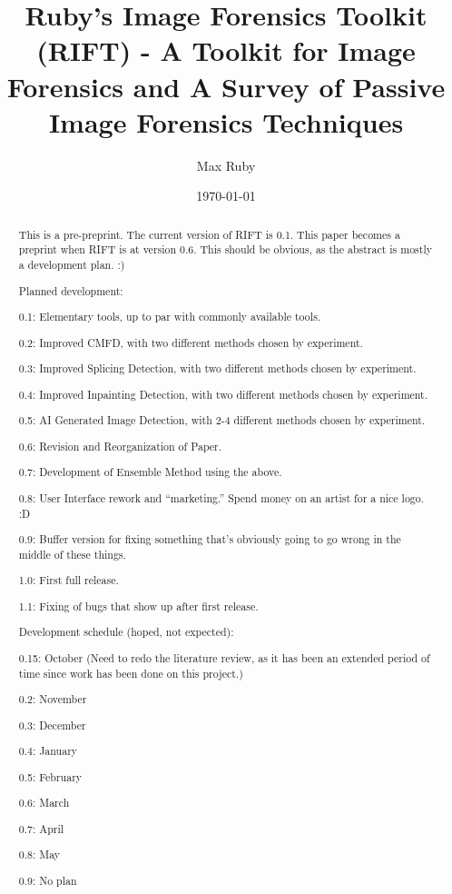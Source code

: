 \documentclass[compsoc]{IEEEtran}
\begin{document}
\title{Ruby's Image Forensics Toolkit (RIFT) - A Toolkit for Image Forensics and A Survey of Passive Image Forensics Techniques}
\author{Max Ruby}

\date{\today}
\maketitle
\begin{abstract}
This is a pre-preprint. The current version of RIFT is 0.1. This paper becomes a preprint when RIFT is at version 0.6. This should be obvious, as the abstract is mostly a development plan. :)

Planned development:

0.1: Elementary tools, up to par with commonly available tools.

0.2: Improved CMFD, with two different methods chosen by experiment.

0.3: Improved Splicing Detection, with two different methods chosen by experiment.

0.4: Improved Inpainting Detection, with two different methods chosen by experiment.

0.5: AI Generated Image Detection, with 2-4 different methods chosen by experiment.

0.6: Revision and Reorganization of Paper.

0.7: Development of Ensemble Method using the above.

0.8: User Interface rework and ``marketing.'' Spend money on an artist for a nice logo. :D

0.9: Buffer version for fixing something that's obviously going to go wrong in the middle of these things.

1.0: First full release.

1.1: Fixing of bugs that show up after first release.

Development schedule (hoped, not expected):

0.15: October (Need to redo the literature review, as it has been an extended period of time since work has been done on this project.)

0.2: November

0.3: December

0.4: January

0.5: February

0.6: March

0.7: April

0.8: May

0.9: No plan


\end{abstract}
\end{document}
